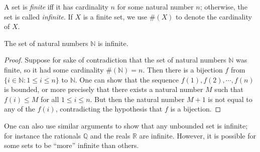 \begin{definition}\label{3.6.10}
A set is \emph{finite} iff it has cardinality \(n\) for some natural number \(n\);
otherwise, the set is called \emph{infinite}.
If \(X\) is a finite set, we use \(\#(X)\) to denote the cardinality of \(X\).
\end{definition}

\setcounter{theorem}{11}
\begin{theorem}\label{3.6.12}
The set of natural numbers \(\mathds{N}\) is infinite.
\end{theorem}

\begin{proof}
Suppose for sake of contradiction that the set of natural numbers \(\mathds{N}\) was finite, so it had some cardinality \(\#(\mathds{N}) = n\).
Then there is a bijection \(f\) from \(\{i \in \mathds{N} : 1 \leq i \leq n\}\) to \(\mathds{N}\).
One can show that the sequence \(f(1), f(2), \cdots, f(n)\) is bounded, or more precisely that there exists a natural number \(M\) such that \(f(i) \leq M\) for all \(1 \leq i \leq n\).
But then the natural number \(M+1\) is not equal to any of the \(f(i)\), contradicting the hypothesis that \(f\) is a bijection.
\end{proof}

\begin{remark}\label{3.6.13}
One can also use similar arguments to show that any unbounded set is infinite;
for instance the rationals \(\mathds{Q}\) and the reals \(\mathds{R}\) are infinite.
However, it is possible for some sets to be ``more'' infinite than others.
\end{remark}

